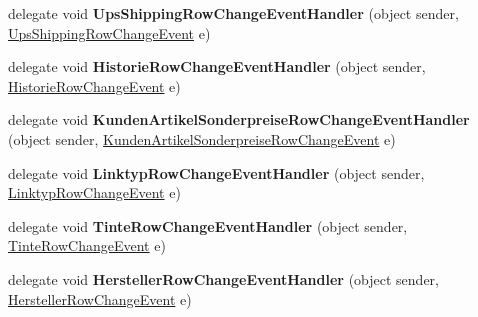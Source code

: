 \begin{DoxyCompactItemize}
\item 
delegate void {\bfseries Ups\+Shipping\+Row\+Change\+Event\+Handler} (object sender, \hyperlink{class_products_1_1_data_1_1ds_sage_1_1_ups_shipping_row_change_event}{Ups\+Shipping\+Row\+Change\+Event} e)\hypertarget{class_products_1_1_data_1_1ds_sage_a880adc5e3b07368c644d90c2ef7a0fd9}{}\label{class_products_1_1_data_1_1ds_sage_a880adc5e3b07368c644d90c2ef7a0fd9}

\item 
delegate void {\bfseries Historie\+Row\+Change\+Event\+Handler} (object sender, \hyperlink{class_products_1_1_data_1_1ds_sage_1_1_historie_row_change_event}{Historie\+Row\+Change\+Event} e)\hypertarget{class_products_1_1_data_1_1ds_sage_a04adc6e68595b3fc8bdbf8f9be31f6b8}{}\label{class_products_1_1_data_1_1ds_sage_a04adc6e68595b3fc8bdbf8f9be31f6b8}

\item 
delegate void {\bfseries Kunden\+Artikel\+Sonderpreise\+Row\+Change\+Event\+Handler} (object sender, \hyperlink{class_products_1_1_data_1_1ds_sage_1_1_kunden_artikel_sonderpreise_row_change_event}{Kunden\+Artikel\+Sonderpreise\+Row\+Change\+Event} e)\hypertarget{class_products_1_1_data_1_1ds_sage_a68107a266a3ac65853b4eb8d901d13a8}{}\label{class_products_1_1_data_1_1ds_sage_a68107a266a3ac65853b4eb8d901d13a8}

\item 
delegate void {\bfseries Linktyp\+Row\+Change\+Event\+Handler} (object sender, \hyperlink{class_products_1_1_data_1_1ds_sage_1_1_linktyp_row_change_event}{Linktyp\+Row\+Change\+Event} e)\hypertarget{class_products_1_1_data_1_1ds_sage_a75bf2f99412361d4d8cdb8fdb05125e6}{}\label{class_products_1_1_data_1_1ds_sage_a75bf2f99412361d4d8cdb8fdb05125e6}

\item 
delegate void {\bfseries Tinte\+Row\+Change\+Event\+Handler} (object sender, \hyperlink{class_products_1_1_data_1_1ds_sage_1_1_tinte_row_change_event}{Tinte\+Row\+Change\+Event} e)\hypertarget{class_products_1_1_data_1_1ds_sage_a9efe06d98ab9022ac32a08a5d08e1a0d}{}\label{class_products_1_1_data_1_1ds_sage_a9efe06d98ab9022ac32a08a5d08e1a0d}

\item 
delegate void {\bfseries Hersteller\+Row\+Change\+Event\+Handler} (object sender, \hyperlink{class_products_1_1_data_1_1ds_sage_1_1_hersteller_row_change_event}{Hersteller\+Row\+Change\+Event} e)\hypertarget{class_products_1_1_data_1_1ds_sage_a1349c48550df7bca3af1195bb9d7c141}{}\label{class_products_1_1_data_1_1ds_sage_a1349c48550df7bca3af1195bb9d7c141}


\end{DoxyCompactItemize}
